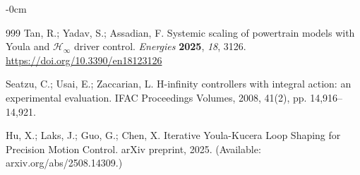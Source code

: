 \documentclass[journal,article,submit,pdftex,moreauthors]{Definitions/mdpi}
\begin{document}
\begin{adjustwidth}{-\extralength}{0cm}
{\begin{thebibliography}{999}
Tan, R.; Yadav, S.; Assadian, F. Systemic scaling of powertrain models with
Youla and $\mathcal{H}_\infty$ driver control.
\textit{Energies} \textbf{2025}, \textit{18}, 3126. \url{https://doi.org/10.3390/en18123126}

Seatzu, C.; Usai, E.; Zaccarian, L. H-infinity controllers with integral action: an experimental evaluation. IFAC Proceedings Volumes, 2008, 41(2), pp. 14,916–14,921.

Hu, X.; Laks, J.; Guo, G.; Chen, X. Iterative Youla-Kucera Loop Shaping for Precision Motion Control. arXiv preprint, 2025. (Available: arxiv.org/abs/2508.14309.)

\end{thebibliography}
}{}

%


\PublishersNote{}
\end{adjustwidth}
\end{document}

